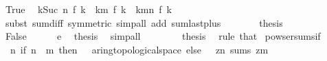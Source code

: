 \begin{isabellebody}
\ True\ \isamarkupfalse%
\ {\isachardoublequoteopen}{\isacharparenleft}{\kern0pt}{\isasymSum}k{\isacharless}{\kern0pt}Suc\ n{\isachardot}{\kern0pt}\ f\ k{\isacharparenright}{\kern0pt}\ {\isacharminus}{\kern0pt}\ {\isacharparenleft}{\kern0pt}{\isasymSum}k{\isacharless}{\kern0pt}m{\isachardot}{\kern0pt}\ f\ k{\isacharparenright}{\kern0pt}\ {\isacharequal}{\kern0pt}\ {\isacharparenleft}{\kern0pt}{\isasymSum}k{\isacharequal}{\kern0pt}m{\isachardot}{\kern0pt}{\isachardot}{\kern0pt}n{\isachardot}{\kern0pt}\ f\ k{\isacharparenright}{\kern0pt}{\isachardoublequoteclose}\isanewline
\ \ \ \ \ \ \isamarkupfalse%
\ {\isacharparenleft}{\kern0pt}subst\ sum{\isacharunderscore}{\kern0pt}diff\ {\isacharbrackleft}{\kern0pt}symmetric{\isacharbrackright}{\kern0pt}{\isacharparenright}{\kern0pt}\ {\isacharparenleft}{\kern0pt}simp{\isacharunderscore}{\kern0pt}all\ add{\isacharcolon}{\kern0pt}\ sum{\isachardot}{\kern0pt}last{\isacharunderscore}{\kern0pt}plus{\isacharparenright}{\kern0pt}\isanewline
\ \ \ \ \isamarkupfalse%
\ \isamarkupfalse%
\ {\isacharquery}{\kern0pt}thesis\ \isacommand{{\isachardot}{\kern0pt}}\isamarkupfalse%
\isanewline
\ \ \isamarkupfalse%
\isanewline
\ \ \ \ \isamarkupfalse%
\ False\isanewline
\ \ \ \ \isamarkupfalse%
\ e\ \isamarkupfalse%
\ {\isacharquery}{\kern0pt}thesis\ \isamarkupfalse%
\ simp{\isacharunderscore}{\kern0pt}all\isanewline
\ \ \isamarkupfalse%
\isanewline
\ \ \isamarkupfalse%
\ \isamarkupfalse%
\ {\isacharquery}{\kern0pt}thesis\ \isamarkupfalse%
\ {\isacharparenleft}{\kern0pt}rule\ that{\isacharparenright}{\kern0pt}\isanewline
{}\isamarkupfalse%
%
\endisatagproof
{\isafoldproof}%
%
\isadelimproof
\isanewline
%
\endisadelimproof
\isanewline
{}\isamarkupfalse%
\ powser{\isacharunderscore}{\kern0pt}sums{\isacharunderscore}{\kern0pt}if{\isacharcolon}{\kern0pt}\isanewline
\ \ {\isachardoublequoteopen}{\isacharparenleft}{\kern0pt}{\isasymlambda}n{\isachardot}{\kern0pt}\ {\isacharparenleft}{\kern0pt}if\ n\ {\isacharequal}{\kern0pt}\ m\ then\ {\isacharparenleft}{\kern0pt}{}\ {\isacharcolon}{\kern0pt}{\isacharcolon}{\kern0pt}\ {\isacharprime}{\kern0pt}a{\isacharcolon}{\kern0pt}{\isacharcolon}{\kern0pt}{\isacharbraceleft}{\kern0pt}ring{\isacharunderscore}{\kern0pt}{}{\isacharcomma}{\kern0pt}topological{\isacharunderscore}{\kern0pt}space{\isacharbraceright}{\kern0pt}{\isacharparenright}{\kern0pt}\ else\ {}{\isacharparenright}{\kern0pt}\ {\isacharasterisk}{\kern0pt}\ z{\isacharcircum}{\kern0pt}n{\isacharparenright}{\kern0pt}\ sums\ z{\isacharcircum}{\kern0pt}m{\isachardoublequoteclose}\isanewline

\end{isabellebody}
